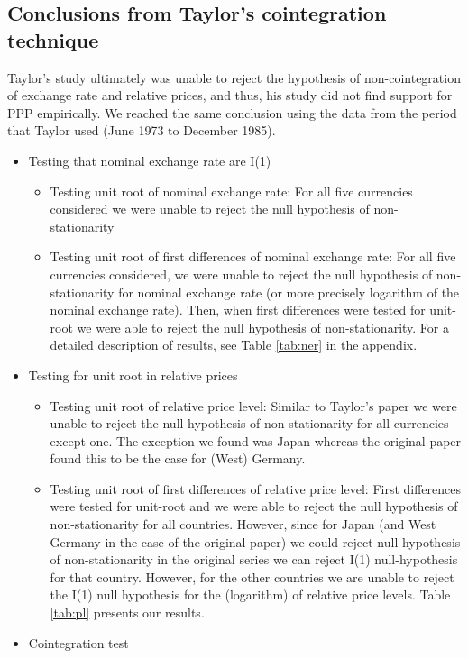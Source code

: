 \documentclass[]{article}
\providecommand{\tightlist}{%
  \setlength{\itemsep}{0pt}\setlength{\parskip}{0pt}}
\begin{document}
\hypertarget{conclusions-from-taylors-cointegration-technique}{%
\subsection{Conclusions from Taylor's cointegration technique}\label{conclusions-from-taylors-cointegration-technique}}

Taylor's study ultimately was unable to reject the hypothesis of non-cointegration of exchange rate and relative prices, and thus, his study did not find support for PPP empirically. We reached the same conclusion using the data from the period that Taylor used (June 1973 to December 1985).

\begin{itemize}
\tightlist
\item
  Testing that nominal exchange rate are I(1)

  \begin{itemize}
  \tightlist
  \item
    Testing unit root of nominal exchange rate: For all five currencies considered we were unable to reject the null hypothesis of non-stationarity
  \item
    Testing unit root of first differences of nominal exchange rate: For all five currencies considered, we were unable to reject the null hypothesis of non-stationarity for nominal exchange rate (or more precisely logarithm of the nominal exchange rate). Then, when first differences were tested for unit-root we were able to reject the null hypothesis of non-stationarity. For a detailed description of results, see Table \ref{tab:ner} in the appendix.
  \end{itemize}
\item
  Testing for unit root in relative prices

  \begin{itemize}
  \tightlist
  \item
    Testing unit root of relative price level: Similar to Taylor's paper we were unable to reject the null hypothesis of non-stationarity for all currencies except one. The exception we found was Japan whereas the original paper found this to be the case for (West) Germany.
  \item
    Testing unit root of first differences of relative price level: First differences were tested for unit-root and we were able to reject the null hypothesis of non-stationarity for all countries. However, since for Japan (and West Germany in the case of the original paper) we could reject null-hypothesis of non-stationarity in the original series we can reject I(1) null-hypothesis for that country. However, for the other countries we are unable to reject the I(1) null hypothesis for the (logarithm) of relative price levels. Table \ref{tab:pl} presents our results.
  \end{itemize}
\item
  Cointegration test


\end{itemize}
\end{document}
